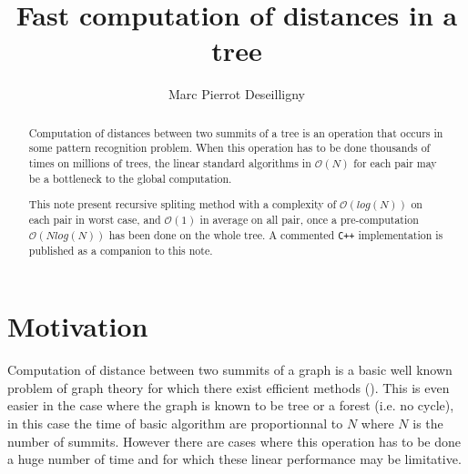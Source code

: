 \documentclass[a4paper]{article}
\begin{document}

\title{Fast computation of distances in a tree}
\author[1]{Marc Pierrot Deseilligny}


\maketitle 

\begin{abstract}
   Computation of distances between two summits of a tree is an operation that occurs in some
pattern recognition problem. When this operation has to be done thousands of times on millions
of trees, the linear standard  algorithms in $\mathcal{O}(N)$ for each pair
    may be a bottleneck to the global computation.

   This note present recursive spliting method with a complexity of $\mathcal{O}(log(N))$ on each pair
   in worst case, and $\mathcal{O}(1)$ in average on all pair, once a pre-computation $\mathcal{O}(N log(N))$
   has been done on the whole tree. A commented {\tt C++} implementation is published as a companion to this note.
\end{abstract}



\section{Motivation}

Computation of distance between two summits of a graph is  a basic well known
problem of graph theory for which there exist efficient methods (\cite{Dikjstra59}). This is even  easier in 
the case where the graph is known to be tree or a forest (i.e. no cycle), in this case
the time of basic algorithm are proportionnal to $N$ where $N$ is the number of
summits. However there are cases where this operation has to be done a huge
number of time and for which these linear performance may be limitative.
\end{document}
